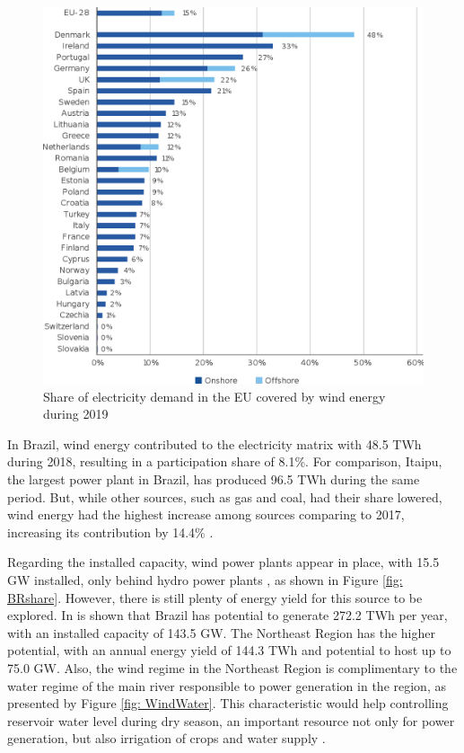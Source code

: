 \begin{figure}[h]
	\caption{Share of electricity demand in the EU covered by wind energy during 2019}
	\begin{center}
		\includegraphics[scale=0.65]{Images/EUrank2019.eps}
	\end{center}
	\label{fig: EUrank}
\end{figure}

In Brazil, wind energy contributed to the electricity matrix with 48.5 TWh during 2018, resulting in a participation share of 8.1\%. For comparison, Itaipu, the largest power plant in Brazil, has produced 96.5 TWh during the same period. But, while other sources, such as gas and coal, had their share lowered, wind energy had the highest increase among sources comparing to 2017, increasing its contribution by 14.4\% \cite{EPE2019}.

Regarding the installed capacity, wind power plants appear in  place, with 15.5 GW installed, only behind hydro power plants \cite{ABEEolica2020}, as shown in Figure \ref{fig: BRshare}. However, there is still plenty of energy yield for this source to be explored. In \cite{Atlas2001} is shown that Brazil has potential to generate 272.2 TWh per year, with an installed capacity of 143.5 GW. The Northeast Region has the higher potential, with an annual energy yield of 144.3 TWh and potential to host up to 75.0 GW. Also, the wind regime in the Northeast Region is complimentary to the water regime of the main river responsible to power generation in the region, as presented by Figure \ref{fig: WindWater}. This characteristic would help controlling reservoir water level during dry season, an important resource not only for power generation, but also irrigation of crops and water supply \cite{ANEEL2005}.

